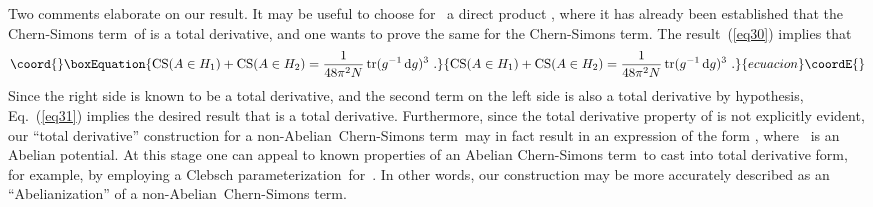 \documentclass[a4paper,12pt,twoside]{article}
\providecommand{\rd}[1]{\mathop{\mathrm{d}#1}}
\providecommand{\tr}{\mathop{\mathrm{tr}}}
\providecommand{\nA}{non-Abelian}
\providecommand{\CSt}{Chern-Simons term}
\providecommand{\Cpr}{Clebsch pa\-ra\-me\-ter\-iza\-tion}
\providecommand{\gdg}{g^{-1} \rd g}
\providecommand{\numeq}[2]{\begin{equation}\coord{}\boxEquation{
#2
\label{#1}
}{
#2
}{ecuacion}\coordE{}\end{equation}}
\providecommand{\refeq}[1]{(\ref{#1})}
\begin{document}
Two comments elaborate on our result. It may be useful to choose for~\coordHE{} a direct
product \coordHE{}, where it has already been established that the
\CSt\ of \coordHE{} is a total derivative, and one wants to prove the same for the \coordHE{}
\CSt. The result~\refeq{eq30} implies that
\numeq{eq31}{
\text{CS}(A\in H_1) + \text{CS}(A\in H_2) = \frac1{48\pi^2N} \tr(\gdg)^3\ .
}
Since the right side is known to be a total derivative, and the second term on the left
side is also a total derivative by hypothesis, Eq.~\refeq{eq31} implies the desired
result that \coordHE{} is  a total derivative. Furthermore, since the total
derivative property of \myHighlight{$\tr(\gdg)^3$}\coordHE{} is not explicitly evident, our ``total derivative''
construction for a \nA\ \CSt\ may in fact result in an expression of the form \myHighlight{$a\rd
a$}\coordHE{}, where~\coordHE{} is an Abelian potential. At this stage one can appeal to known
properties of an Abelian \CSt\ to cast \myHighlight{$a\rd a$}\coordHE{} into total derivative form, for
example, by employing a \Cpr\ for~\coordHE{}. In other words, our construction may be
more accurately described as an ``Abelianization'' of a \nA\ \CSt.
\end{document}
